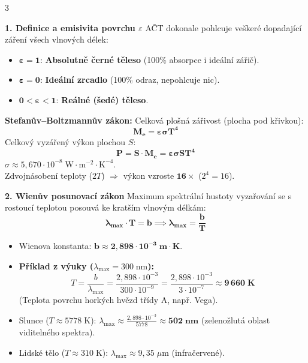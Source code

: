 \documentclass[9pt,a4paper]{article}
\begin{document}
\begin{tcolorbox}[secbox,title=3. ZÁŘENÍ ABSOLUTNĚ ČERNÉHO TĚLESA (AČT) A PLANCKŮV ZÁKON]
\begin{multicols}{3}

\textbf{1. Definice a emisivita povrchu $\varepsilon$}
AČT dokonale pohlcuje veškeré dopadající záření všech vlnových délek:
\begin{itemize}
  \item $\mathbf{\varepsilon = 1}$: \textbf{Absolutně černé těleso} (100\% absorpce i ideální zářič).
  \item $\mathbf{\varepsilon = 0}$: \textbf{Ideální zrcadlo} (100\% odraz, nepohlcuje nic).
  \item $\mathbf{0 < \varepsilon < 1}$: \textbf{Reálné (šedé) těleso}.
\end{itemize}
\textbf{Stefanův--Boltzmannův zákon:}
Celková plošná zářivost (plocha pod křivkou):
\[\mathbf{M_e = \varepsilon \sigma T^4}\]
Celkový vyzářený výkon plochou $S$:
\[\mathbf{P = S \cdot M_e = \varepsilon \sigma S T^4}\]
$\sigma \approx 5{,}670 \cdot 10^{-8}\;\text{W}\cdot\text{m}^{-2}\cdot\text{K}^{-4}$.\\
Zdvojnásobení teploty ($2T$) $\Rightarrow$ výkon vzroste $\mathbf{16\times}$ ($2^4 = 16$).

\columnbreak

\textbf{2. Wienův posunovací zákon}
Maximum spektrální hustoty vyzařování se s rostoucí teplotou posouvá ke kratším vlnovým délkám:
\[\mathbf{\lambda_{\max} \cdot T = b \implies \lambda_{\max} = \frac{b}{T}}\]
\begin{itemize}
  \item Wienova konstanta: $\mathbf{b \approx 2{,}898 \cdot 10^{-3}\;\text{m}\cdot\text{K}}$.
  \item \textbf{Příklad z výuky ($\lambda_{\max} = 300\;\text{nm}$):}
  \[T = \frac{b}{\lambda_{\max}} = \frac{2{,}898 \cdot 10^{-3}}{300 \cdot 10^{-9}} = \frac{2{,}898 \cdot 10^{-3}}{3 \cdot 10^{-7}} \approx \mathbf{9\,660\;\text{K}}\]
  (Teplota povrchu horkých hvězd třídy A, např. Vega).
  \item Slunce ($T \approx 5778\;\text{K}$): $\lambda_{\max} \approx \frac{2{,}898 \cdot 10^{-3}}{5778} \approx \mathbf{502\;\text{nm}}$ (zelenožlutá oblast viditelného spektra).
  \item Lidské tělo ($T \approx 310\;\text{K}$): $\lambda_{\max} \approx 9{,}35\;\mu\text{m}$ (infračervené).
\end{itemize}


\end{multicols}
\end{tcolorbox}
\end{document}
